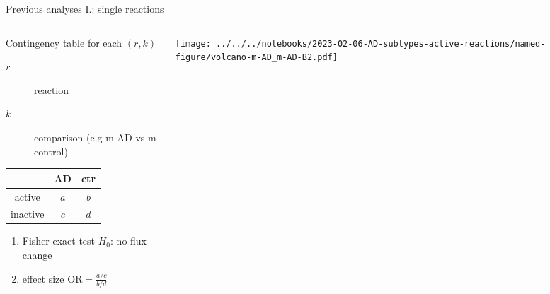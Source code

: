 \documentclass[aspectratio=169]{beamer}
\begin{document}
\begin{frame}{Previous analyses I.: single reactions}
\begin{columns}[t]
\begin{column}{0.5\textwidth}
Contingency table for each $(r,k)$
  \begin{description}
    \item[$r$] reaction
    \item[$k$] comparison (e.g m-AD vs m-control)
  \end{description}

\begin{center}
\begin{tabular}{c|cc|}
& AD & ctr \\
\hline
active & $a$ & $b$ \\
inactive & $c$ & $d$ \\
\hline
\end{tabular}
\end{center}

\begin{enumerate}
  \item Fisher exact test $H_0$: no flux change
  \item effect size
$
  \mathrm{OR} = \frac{a/c}{b/d}
$
\end{enumerate}
\end{column}

\begin{column}{0.5\textwidth}

\texttt{[image: ../../../notebooks/2023-02-06-AD-subtypes-active-reactions/named-figure/volcano-m-AD\_m-AD-B2.pdf]}
\end{column}
\end{columns}
\end{frame}
\end{document}
